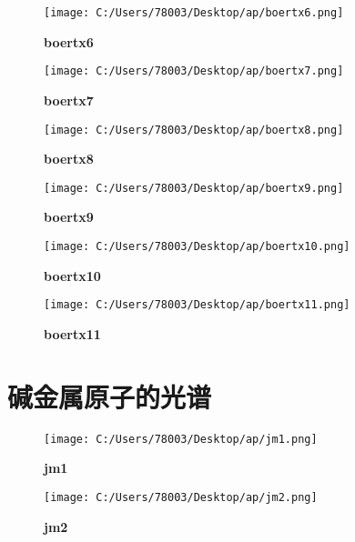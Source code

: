 \documentclass[UTF8]{report}
\theoremstyle{MyLineTheoremStyle} %
\theoremstyle{MyBlockTheoremStyle} %
\theoremstyle{MySubsubsectionStyle} %
\begin{document}
\begin{figure}[ht]
    \centering
    \texttt{[image: C:/Users/78003/Desktop/ap/boertx6.png]}
    \caption{\textbf{boertx6}}
    \label{fig:boertx6}
\end{figure}

\begin{figure}[ht]
    \centering
    \texttt{[image: C:/Users/78003/Desktop/ap/boertx7.png]}
    \caption{\textbf{boertx7}}
    \label{fig:boertx7}
\end{figure}

\begin{figure}[ht]
    \centering
    \texttt{[image: C:/Users/78003/Desktop/ap/boertx8.png]}
    \caption{\textbf{boertx8}}
    \label{fig:boertx8}
\end{figure}

\begin{figure}[ht]
    \centering
    \texttt{[image: C:/Users/78003/Desktop/ap/boertx9.png]}
    \caption{\textbf{boertx9}}
    \label{fig:boertx9}
\end{figure}

\begin{figure}[ht]
    \centering
    \texttt{[image: C:/Users/78003/Desktop/ap/boertx10.png]}
    \caption{\textbf{boertx10}}
    \label{fig:boertx10}
\end{figure}

\begin{figure}[ht]
    \centering
    \texttt{[image: C:/Users/78003/Desktop/ap/boertx11.png]}
    \caption{\textbf{boertx11}}
    \label{fig:boertx11}
\end{figure}

\cleardoublepage
\section{碱金属原子的光谱}

\begin{figure}[ht]
    \centering
    \texttt{[image: C:/Users/78003/Desktop/ap/jm1.png]}
    \caption{\textbf{jm1}}
    \label{fig:jm1}
\end{figure}

\begin{figure}[ht]
    \centering
    \texttt{[image: C:/Users/78003/Desktop/ap/jm2.png]}
    \caption{\textbf{jm2}}
    \label{fig:jm2}
\end{figure}
\end{document}
